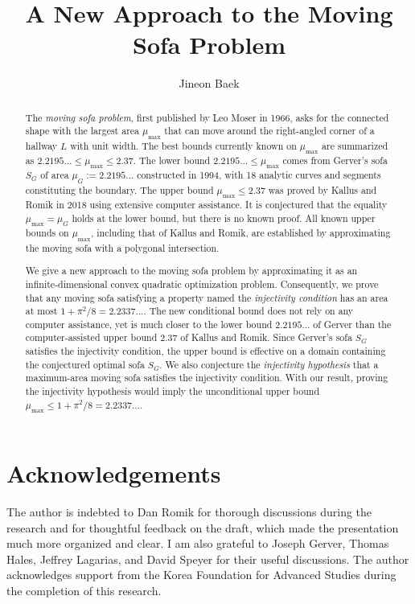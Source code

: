 \documentclass[10pt]{article}
\title{A New Approach to the Moving Sofa Problem}
\author{Jineon Baek}
\theoremstyle{plain}
\theoremstyle{definition}
\theoremstyle{remark}
\begin{document}
\maketitle

\begin{abstract}
    The \emph{moving sofa problem}, first published by Leo Moser in 1966, asks for the connected shape with the largest area $\mu_{\text{max}}$ that can move around the right-angled corner of a hallway $L$ with unit width. The best bounds currently known on $\mu_{\max}$ are summarized as $2.2195\ldots \leq \mu_{\max} \leq 2.37$. The lower bound $2.2195\ldots \leq \mu_{\max}$ comes from Gerver's sofa $S_G$ of area $\mu_G := 2.2195\ldots$ constructed in 1994, with 18 analytic curves and segments constituting the boundary. The upper bound $\mu_{\max} \leq 2.37$ was proved by Kallus and Romik in 2018 using extensive computer assistance. It is conjectured that the equality $\mu_{\max} = \mu_G$ holds at the lower bound, but there is no known proof. All known upper bounds on $\mu_{\max}$, including that of Kallus and Romik, are established by approximating the moving sofa with a polygonal intersection.

    We give a new approach to the moving sofa problem by approximating it as an infinite-dimensional convex quadratic optimization problem. Consequently, we prove that any moving sofa satisfying a property named the \emph{injectivity condition} has an area at most $1 + \pi^2/8 = 2.2337\dots$. The new conditional bound does not rely on any computer assistance, yet is much closer to the lower bound $2.2195\ldots$ of Gerver than the computer-assisted upper bound $2.37$ of Kallus and Romik. Since Gerver's sofa $S_G$ satisfies the injectivity condition, the upper bound is effective on a domain containing the conjectured optimal sofa $S_G$. We also conjecture the \emph{injectivity hypothesis} that a maximum-area moving sofa satisfies the injectivity condition. With our result, proving the injectivity hypothesis would imply the unconditional upper bound $\mu_{\max} \leq 1 + \pi^2/8 = 2.2337\ldots$.
\end{abstract}

\tableofcontents



\section*{Acknowledgements}

The author is indebted to Dan Romik for thorough discussions during the research and for thoughtful feedback on the draft, which made the presentation much more organized and clear. I am also grateful to Joseph Gerver, Thomas Hales, Jeffrey Lagarias, and David Speyer for their useful discussions. The author acknowledges support from the Korea Foundation for Advanced Studies during the completion of this research.

\printbibliography
\end{document}
